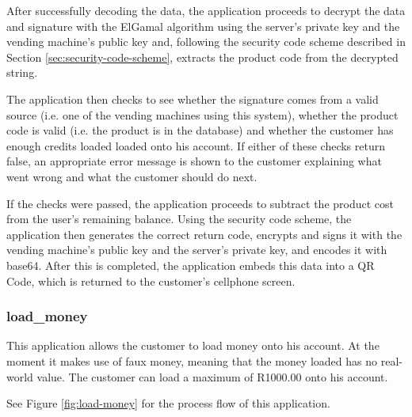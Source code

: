 After successfully decoding the data, the application proceeds to decrypt the data and
signature with the ElGamal algorithm using the server's private key and the
vending machine's public key and, following the security code scheme described in Section
\ref{sec:security-code-scheme}, extracts the product code from the decrypted
string.

The application then checks to see whether the signature comes from a valid source (i.e.
one of the vending machines using this system), whether the product code is
valid (i.e. the product is in the database) and whether the customer has enough
credits loaded loaded onto his account. If either of these checks return false,
an appropriate error message is shown to the customer explaining what went wrong
and what the customer should do next.

If the checks were passed, the application proceeds to subtract the product cost from
the user's remaining balance. Using the security code scheme, the application then
generates the correct return code, encrypts and signs it with the vending
machine's public key and the server's private key, and encodes it with base64.
After this is completed, the application embeds this data into a QR Code, which is
returned to the customer's cellphone screen.

\subsubsection{load\_money}

This application allows the customer to load money onto his account. At the moment it
makes use of faux money, meaning that the money loaded has no real-world value.
The customer can load a maximum of R1000.00 onto his account.

See Figure \ref{fig:load-money} for the process flow of this application.

